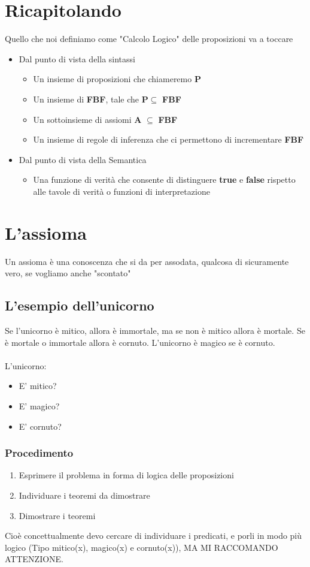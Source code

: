 \documentclass[12pt, a4paper, openany, oneside]{book}
\begin{document}
\section{Ricapitolando} 
Quello che noi definiamo come "Calcolo Logico" delle proposizioni va a toccare
\begin{itemize}
	\item Dal punto di vista della sintassi
	\begin{itemize}
		\item Un insieme di proposizioni che chiameremo \textbf{P}
		\item Un insieme di \textbf{FBF}, tale che \textbf{P}$ \subseteq$ \textbf{FBF}
		\item Un sottoinsieme di assiomi \textbf{A} $ \subseteq $ \textbf{FBF}
		\item Un insieme di regole di inferenza che ci permettono di 
		incrementare \textbf{FBF}
	\end{itemize}
	\item Dal punto di vista della Semantica
	\begin{itemize}
		\item Una funzione di verità che consente di distinguere \textbf{true} e
		\textbf{false} rispetto alle tavole di verità o funzioni di interpretazione
	\end{itemize}
\end{itemize}
\section{L'assioma}
Un assioma è una conoscenza che si da per assodata, qualcosa di sicuramente vero,
se vogliamo anche "scontato" 
\subsection{L'esempio dell'unicorno}
Se l'unicorno è mitico, allora è immortale, ma se non è mitico allora è mortale.
Se è mortale o immortale allora è cornuto. L'unicorno è magico se è cornuto. \\ \\
L'unicorno:
\begin{itemize}
	\item E' mitico?
	\item E' magico?
	\item E' cornuto?
\end{itemize}
\subsubsection{Procedimento}
\begin{enumerate}
	\item Esprimere il problema in forma di logica delle proposizioni
	\item Individuare i teoremi da dimostrare
	\item Dimostrare i teoremi
\end{enumerate}
Cioè concettualmente devo cercare di individuare i predicati, e porli in modo
più logico (Tipo mitico(x), magico(x) e cornuto(x)), MA MI RACCOMANDO ATTENZIONE.
\end{document}
